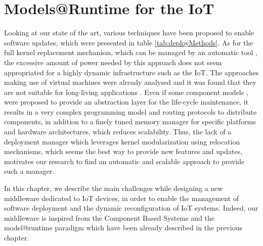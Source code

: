 \chapter{Models@Runtime for the IoT}
\label{ch:MARContiki}

Looking at our state of the art, various techniques have been proposed to enable software updates, which were presented in table \ref{tab:deployMethods}.
As for the full kernel replacement mechanism, which can be managed by an automatic tool \cite{hui2004dynamic}, the excessive amount of power needed by this approach does not seem appropriated for a highly dynamic infrastructure such as the IoT.
The approaches making use of virtual machines were already analysed and it was found that they are not suitable for long-living applications \cite{oliver2014reprogramming}.
Even if some component models  \cite{mottola2008figaro},  \cite{taherkordi2013optimizing} were proposed to provide an abstraction layer for the life-cycle maintenance, it results in a very complex programming model and routing protocols to distribute components, in addition to a finely tuned memory manager for specific platforms and hardware architectures, which reduces scalability.
Thus, the lack of a deployment manager which leverages kernel modularization using relocation mechanisms, which seems the best way to provide new features and updates, motivates our research to find an automatic and scalable approach to provide such a manager.

In this chapter, we describe the main challenges while designing a new middleware dedicated to IoT devices, in order to enable the management of software deployment and the dynamic reconfiguration of IoT systems.
Indeed, our middleware is inspired from the Component Based Systems and the model@runtime paradigm which have been already described in the previous chapter.


